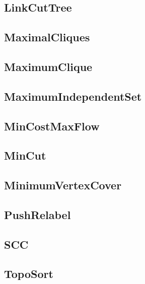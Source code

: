 \subsection{LinkCutTree}
\raggedbottom
\hrulefill
\subsection{MaximalCliques}
\raggedbottom
\hrulefill
\subsection{MaximumClique}
\raggedbottom
\hrulefill
\subsection{MaximumIndependentSet}
\raggedbottom
\hrulefill
\subsection{MinCostMaxFlow}
\raggedbottom
\hrulefill
\subsection{MinCut}
\raggedbottom
\hrulefill
\subsection{MinimumVertexCover}
\raggedbottom
\hrulefill
\subsection{PushRelabel}
\raggedbottom
\hrulefill
\subsection{SCC}
\raggedbottom
\hrulefill
\subsection{TopoSort}
\raggedbottom
\hrulefill
